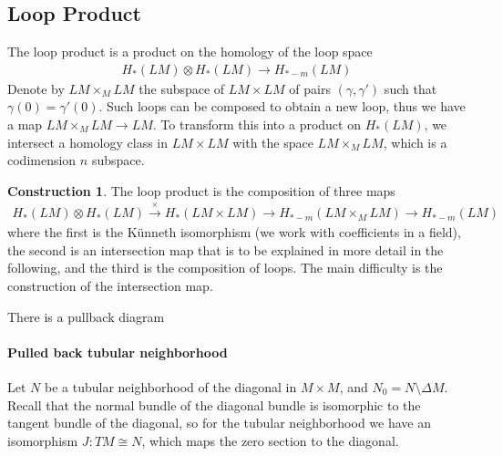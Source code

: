 \documentclass{scrartcl}
\theoremstyle{plain}
\theoremstyle{definition}
\newtheorem{construction}[theorem]{Construction}
\newcommand{\iso}{\cong}
\newcommand{\defeq}{\coloneqq}
\let\xto\xrightarrow
\let\xfrom\xleftarrow
\begin{document}
\subsection{Loop Product}
The loop product is a product on the homology of the loop space 
\begin{align*}
    H_*(LM)\otimes H_*(LM)\to H_{*-m}(LM)
\end{align*}
Denote by $LM\times_M LM$ the subspace of $LM\times LM$ of pairs $(\gamma, \gamma')$ such that $\gamma(0) = \gamma'(0)$. Such loops can be composed to obtain a new loop, thus we have a map $LM\times_M LM\to LM$. To transform this into a product on $H_*(LM)$, we intersect a homology class in $LM\times LM$ with the space $LM\times_M LM$, which is a codimension $n$ subspace.

\begin{construction}
The loop product is the composition of three maps
\begin{align*}
    H_*(LM)\otimes H_*(LM)\xto{\times} H_{*}(LM\times LM)\xto{} H_{*-m}(LM\times_M LM)\to H_{*-m}(LM)
\end{align*}
where the first is the Künneth isomorphism (we work with coefficients in a field), the second is an intersection map that is to be explained in more detail in the following, and the third is the composition of loops. The main difficulty is the construction of the intersection map.
\end{construction}

There is a pullback diagram

\begin{center}
\end{center}





\paragraph{Pulled back tubular neighborhood} Let $N$ be a tubular neighborhood of the diagonal in $M\times M$, and $N_0 = N\setminus \Delta M$. Recall that the normal bundle of the diagonal bundle is isomorphic to the tangent bundle of the diagonal, so for the tubular neighborhood we have an isomorphism $J\colon TM\iso N$, which maps the zero section to the diagonal. 
\end{document}
